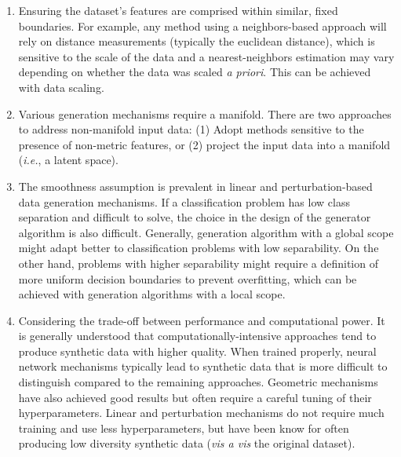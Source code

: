 \begin{enumerate}

    \item Ensuring the dataset's features are comprised within similar, fixed
        boundaries. For example, any method using a neighbors-based approach
        will rely on distance measurements (typically the euclidean distance),
        which is sensitive to the scale of the data and a nearest-neighbors
        estimation may vary depending on whether the data was scaled \textit{a
        priori}. This can be achieved with data scaling. 

    \item Various generation mechanisms require a manifold. There are two
        approaches to address non-manifold input data: (1) Adopt methods
        sensitive to the presence of non-metric features, or (2) project the
        input data into a manifold (\textit{i.e.}, a latent space).

    \item The smoothness assumption is prevalent in linear and
        perturbation-based data generation mechanisms. If a classification
        problem has low class separation and difficult to solve, the choice in
        the design of the generator algorithm is also difficult. Generally,
        generation algorithm with a global scope might adapt better to
        classification problems with low separability. On the other hand,
        problems with higher separability might require a definition of more
        uniform decision boundaries to prevent overfitting, which can be
        achieved with generation algorithms with a local scope.

    \item Considering the trade-off between performance and computational
        power. It is generally understood that computationally-intensive
        approaches tend to produce synthetic data with higher quality. When
        trained properly, neural network mechanisms typically lead to
        synthetic data that is more difficult to distinguish compared to the
        remaining approaches. Geometric mechanisms have also achieved good
        results but often require a careful tuning of their hyperparameters.
        Linear and perturbation mechanisms do not require much training and
        use less hyperparameters, but have been know for often producing low
        diversity synthetic data (\textit{vis a vis} the original dataset).

\end{enumerate}

